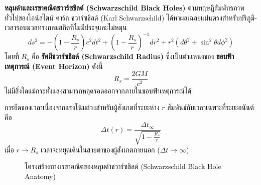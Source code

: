\textbf{หลุมดำและเรขาคณิตชวาร์ซชิลด์ (Schwarzschild Black Holes)} ตามทฤษฎีสัมพัทธภาพทั่วไปของไอน์สไตน์ คาร์ล ชวาร์ซชิลด์ (Karl Schwarzschild) ได้หาผลเฉลยแม่นตรงสำหรับปริภูมิ-เวลารอบมวลทรงกลมสถิตที่ไม่มีประจุและไม่หมุน
\begin{equation}
ds^2 = -\left(1 - \frac{R_s}{r}\right) c^2 dt^2 + \left(1 - \frac{R_s}{r}\right)^{-1} dr^2 + r^2 (d\theta^2 + \sin^2\theta d\phi^2)
\end{equation}
โดยที่ $R_s$ คือ \textbf{รัศมีชวาร์ซชิลด์ (Schwarzschild Radius)} ซึ่งเป็นตำแหน่งของ \textbf{ขอบฟ้าเหตุการณ์ (Event Horizon)} ดังนี้
\begin{equation}
R_s = \frac{2GM}{c^2}
\end{equation}
ไม่มีสิ่งใดแม้กระทั่งแสงสามารถหลุดรอดออกจากภายในขอบฟ้าเหตุการณ์ได้

การยืดของเวลาเนื่องจากแรงโน้มถ่วงสำหรับผู้สังเกตที่ระยะห่าง $r$ สัมพันธ์กับเวลาเฉพาะที่ระยะอนันต์คือ
\begin{equation}
\Delta t(r) = \frac{\Delta t_\infty}{\sqrt{1 - \frac{R_s}{r}}}
\end{equation}
เมื่อ $r \to R_s$ เวลาจะหยุดเดินในสายตาของผู้สังเกตภายนอก ($\Delta t \to \infty$)

\begin{figure}[H]
\centering
{}
\caption{โครงสร้างทางเรขาคณิตของหลุมดำชวาร์ซชิลด์ (Schwarzschild Black Hole Anatomy)}
\label{fig:black_hole_anatomy}
\end{figure}

